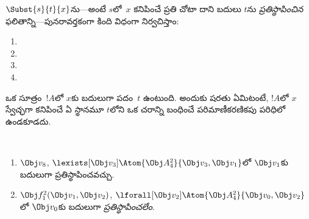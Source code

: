 \documentclass[../../../include/open-logic-section]{subfiles}
\begin{document}


\begin{defn}[పదంలో ప్రతిస్థాపన]
$\Subst{s}{t}{x}$ను---అంటే $s$లో~$x$ కనిపించే ప్రతి చోటా దాని బదులు $t$ను
\emph{ప్రతిస్థాపించిన} ఫలితాన్ని---పునరావర్తకంగా కింది విధంగా
నిర్వచిస్తాం:
\begin{enumerate}
\item {}

\item {}

\item {}

\item{}
\end{enumerate}
\end{defn}

\begin{defn}
ఒక సూత్రం~$!A$లో $x$కు బదులుగా పదం~$t$ \emph{} ఉంటుంది.
అందుకు షరతు ఏమిటంటే, $!A$లో $x$ స్వేచ్ఛగా కనిపించే ఏ స్థానమూ $t$లోని ఒక
చరాన్ని బంధించే పరిమాణీకరణికపు పరిధిలో ఉండకూడదు.
\end{defn}

\begin{ex} ~
\begin{enumerate}
\item $\Obj v_8$, $\lexists[\Obj
  v_3]\Atom{\Obj A^2_4}{\Obj v_3,\Obj v_1}$లో $\Obj v_1$కు బదులుగా ప్రతిస్థాపించవచ్చు.

\item $\Obj f^2_1(\Obj v_1, \Obj v_2)$, $\lforall[\Obj v_2]\Atom{\Obj A^2_4}{\Obj v_0,\Obj v_2}$లో
  $\Obj v_0$కు బదులుగా \emph{ప్రతిస్థాపించలేం}.
\end{enumerate}
\end{ex}
\end{document}
